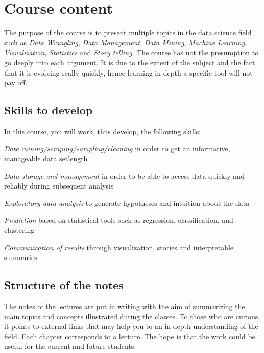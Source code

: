 
\section*{Course content}

The purpose of the course is to present multiple topics in the data science field such as \emph{Data Wrangling}, \emph{Data Management}, \emph{Data Mining}, \emph{Machine Learning}, \emph{Visualization}, \emph{Statistics} and \emph{Story telling}. The course has not the presumption to go deeply into each argument. It is due to the extent of the subject and the fact that it is evolving really quickly, hence learning in depth a specific tool will not pay off.

\subsection*{Skills to develop}

In this course, you will work, thus develop, the following skills:

\begin{description}
 \item \emph{Data mining/scraping/sampling/cleaning} in order to get an informative, manageable data setlength
 \item \emph{Data storage and management} in order to be able to access data quickly and reliably during subsequent analysis
 \item \emph{Exploratory data analysis} to generate hypotheses and intuition about the data
 \item \emph{Prediction} based on statistical tools such as regression, classification, and clustering
 \item \emph{Communication of results} through visualization, stories and interpretable summaries
\end{description}

\subsection*{Structure of the notes}

The notes of the lectures are put in writing with the aim of summarizing the main topics and concepts illustrated during the classes. To those who are curious, it points to external links that may help you to an in-depth understanding of the field. Each chapter corresponds to a lecture. The hope is that the work could be useful for the current and future students. 


